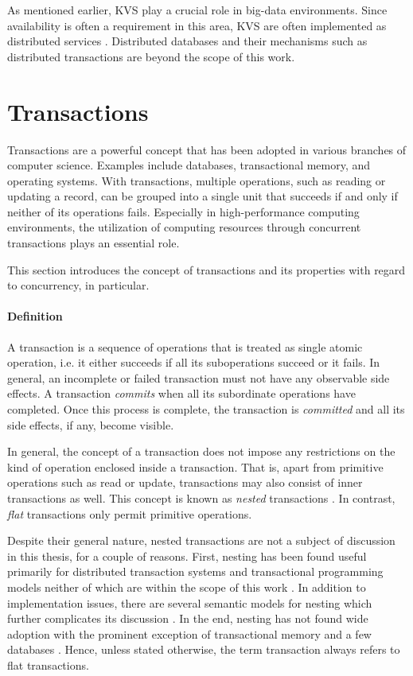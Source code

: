 As mentioned earlier, KVS play a crucial role in big-data environments. Since
availability is often a requirement in this area, KVS are often implemented as
distributed services \cite{decandia2007dynamo, lakshman2010cassandra,
wang2015hydradb}. Distributed databases and their mechanisms such as distributed
transactions are beyond the scope of this work.

\section{Transactions}

Transactions are a powerful concept that has been adopted in various branches of
computer science. Examples include databases, transactional memory, and
operating systems. With transactions, multiple operations, such as reading or
updating a record, can be grouped into a single unit that succeeds if and only
if neither of its operations fails. Especially in high-performance computing
environments, the utilization of computing resources through concurrent
transactions plays an essential role.

This section introduces the concept of transactions and its properties with
regard to concurrency, in particular.

\paragraph{Definition}

A transaction is a sequence of operations that is treated as single atomic
operation, i.e. it either succeeds if all its suboperations succeed or it fails.
In general, an incomplete or failed transaction must not have any observable
side effects. A transaction \emph{commits} when all its subordinate operations
have completed. Once this process is complete, the transaction is
\emph{committed} and all its side effects, if any, become visible.

In general, the concept of a transaction does not impose any restrictions on the
kind of operation enclosed inside a transaction. That is, apart from primitive
operations such as read or update, transactions may also consist of inner
transactions as well. This concept is known as \emph{nested} transactions
\cite{gray1981transaction}. In contrast, \emph{flat} transactions only permit
primitive operations.

Despite their general nature, nested transactions are not a subject of
discussion in this thesis, for a couple of reasons. First, nesting has been
found useful primarily for distributed transaction systems and transactional
programming models neither of which are within the scope of this work
\cite{moss2006open}. In addition to implementation issues, there are several
semantic models for nesting which further complicates its discussion
\cite{harder1993concurrency, weikum1992concepts}. In the end, nesting has not
found wide adoption with the prominent exception of transactional memory
\cite{moss2006nested, moravan2006supporting, saha2006mcrt,
jacobi2012transactional} and a few databases \cite{olson1999berkeley}. Hence,
unless stated otherwise, the term transaction always refers to flat
transactions.

